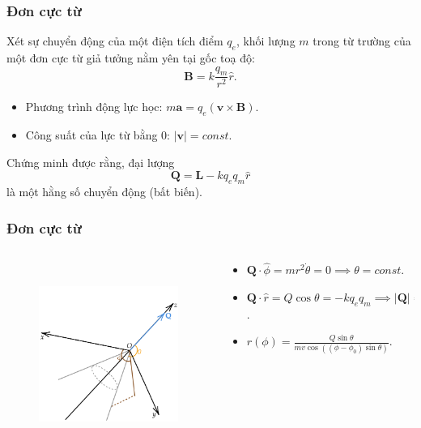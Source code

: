 \begin{frame}
    \frametitle{Đơn cực từ}
    Xét sự chuyển động của một điện tích điểm \(q_e\), khối lượng \(m\) trong từ trường của một đơn cực từ giả tưởng nằm yên tại gốc toạ độ:
    \[\mathbf{B}=k\frac{q_m}{r^2}\hat{r}.\]
    \begin{itemize}
        \item Phương trình động lực học: \(m\mathbf{a}=q_e(\mathbf{v}\times\mathbf{B})\).
        \item Công suất của lực từ bằng 0: \(\lvert\mathbf{v}\rvert=const\).
    \end{itemize}
    Chứng minh được rằng, đại lượng \[\mathbf{Q}=\mathbf{L}-kq_e q_m \hat{r}\] là một hằng số chuyển động (bất biến).
\end{frame}
\begin{frame}
    \frametitle{Đơn cực từ}
    \begin{columns}
        \begin{column}{0.5\textwidth}
            \vspace{-16pt}

            \begin{figure}
        \centering
        \includegraphics[width=6cm, height=6cm]{Content/Figure/magnetic_monopole.png}
    \end{figure}
        \end{column}
        \begin{column}{0.5\textwidth}
            \begin{itemize}
                \item \(\mathbf{Q}\cdot\hat{\phi}=mr^2\dot\theta=0\implies \theta=const\).
                \item \(\mathbf{Q}\cdot\hat{r}=Q\cos\theta=-kq_e q_m \implies \lvert \mathbf{Q}\rvert =const\).
                \item \(r(\phi)=\frac{Q\sin\theta}{mv\cos((\phi-\phi_0)\sin\theta)}\).
            \end{itemize}
            
        \end{column}
    \end{columns}
\end{frame}

